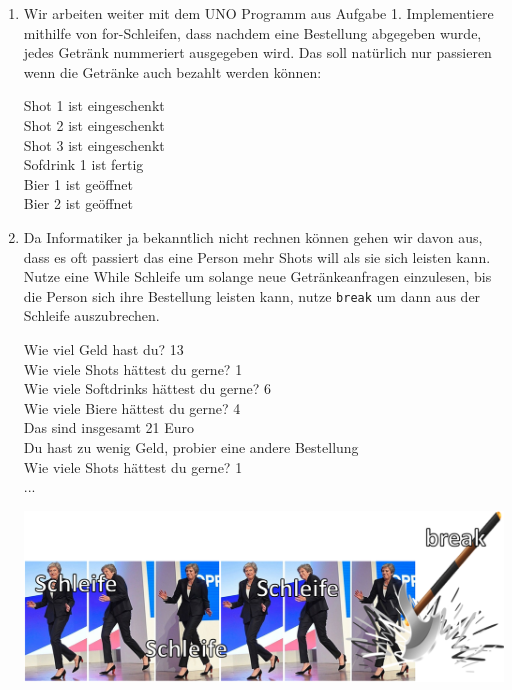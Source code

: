 \documentclass{../../sheet}
\begin{document}
\newpage
{}
\begin{enumerate}
    \item Wir arbeiten weiter mit dem UNO Programm aus Aufgabe 1. Implementiere mithilfe von for-Schleifen, dass nachdem eine Bestellung abgegeben wurde, jedes Getränk nummeriert ausgegeben wird. Das soll natürlich nur passieren wenn die Getränke auch bezahlt werden können:
          \begin{ausgabe}
              Shot 1 ist eingeschenkt\\
              Shot 2 ist eingeschenkt\\
              Shot 3 ist eingeschenkt\\
              Sofdrink 1 ist fertig\\
              Bier 1 ist geöffnet\\
              Bier 2 ist geöffnet
          \end{ausgabe}
    \item Da Informatiker ja bekanntlich nicht rechnen können gehen wir davon aus, dass es oft passiert das eine Person mehr Shots will als sie sich leisten kann. Nutze eine While Schleife um solange neue Getränkeanfragen einzulesen, bis die Person sich ihre Bestellung leisten kann, nutze \texttt{break} um dann aus der Schleife auszubrechen.
    \begin{ausgabe}
        Wie viel Geld hast du? 13\\
        Wie viele Shots hättest du gerne? 1\\
        Wie viele Softdrinks hättest du gerne? 6\\
        Wie viele Biere hättest du gerne? 4\\
        Das sind insgesamt 21 Euro\\
        Du hast zu wenig Geld, probier eine andere Bestellung\\
        Wie viele Shots hättest du gerne? 1\\
        ...
    \end{ausgabe}

    \includegraphics[width=1\linewidth]{../../memes/breakohnerand.png}
\end{enumerate}
\newpage
\end{document}
